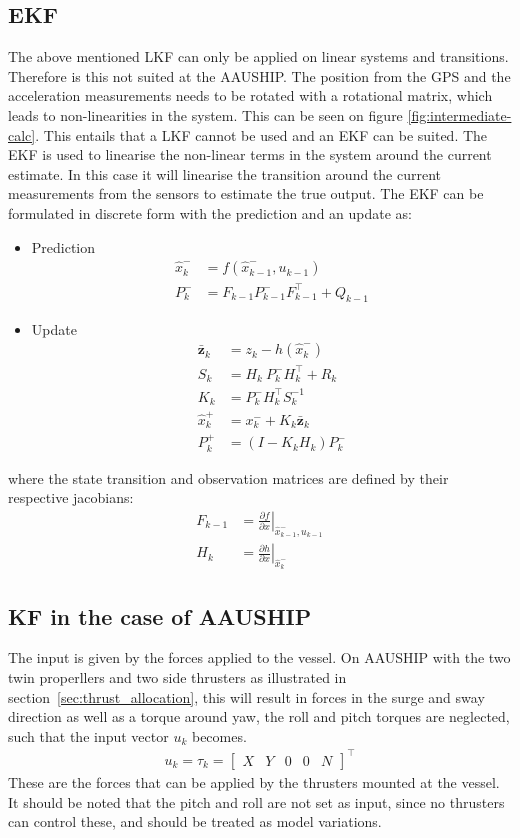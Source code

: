 \subsection{\acl{EKF}}
The above mentioned \ac{LKF} can only be applied on linear systems and transitions. Therefore is this not suited at the AAUSHIP. The position from the \ac{GPS} and the acceleration measurements needs to be rotated with a rotational matrix, which leads to non-linearities in the system. This can be seen on figure \vref{fig:intermediate-calc}. This entails that a \ac{LKF} cannot be used and an \ac{EKF} can be suited. The \ac{EKF} is used to linearise the non-linear terms in the system around the current estimate. In this case it will linearise the transition around the current measurements from the sensors to estimate the true output. The \ac{EKF} can be formulated in discrete form with the prediction and an update as:
\begin{itemize}\tightlist
\item Prediction
\begin{align}
\hat x_k^- &= f(\hat x_{k-1}^-,u_{k-1})\\
P_k^- &= F_{k-1}P_{k-1}^-F_{k-1}^\top+Q_{k-1}
\end{align}
\item Update
\begin{align}
\bar{\mathbf{z}}_k &= z_k - h(\hat x_k^-)\\
S_k &= H_k\ P_k^-H_k^\top + R_k\\
K_k &= P_k^-H_k^\top S_k^{-1}\\
\hat x_k^+ &= x_k^- + K_k \bar{\mathbf{z}}_k\\
P_k^+ &= (I - K_k H_k) P_k^-
\end{align}
\end{itemize}
where the state transition and observation matrices are defined by their respective jacobians:
\begin{align}
F_{k-1} &= \left.\frac{\partial f}{\partial x}\right|_{\hat x_{k-1}^-,u_{k-1}}\\
H_k &= \left.\frac{\partial h}{\partial x}\right|_{\hat x_{k}^-}
\end{align}

\subsection{\acl{KF} in the case of AAUSHIP}
\label{sec:kfonaauship}
The input is given by the forces applied to the vessel. On AAUSHIP with the two twin properllers and two side thrusters as illustrated in section~\vref{sec:thrust_allocation}, this will result in forces in the surge and sway direction as well as a torque around yaw, the roll and pitch torques are neglected, such that the input vector $u_k$ becomes.
\begin{align}
u_k = \tau_k =
\begin{bmatrix}
X & Y & 0 & 0 & N
\end{bmatrix}^\top
\end{align}
These are the forces that can be applied by the thrusters mounted at the vessel. It should be noted that the pitch and roll are not set as input, since no thrusters can control these, and should be treated as model variations.

